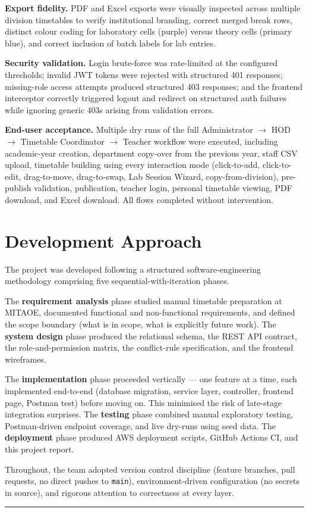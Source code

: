 \textbf{Export fidelity.} PDF and Excel exports were visually inspected across multiple division timetables to verify institutional branding, correct merged break rows, distinct colour coding for laboratory cells (purple) versus theory cells (primary blue), and correct inclusion of batch labels for lab entries.

\textbf{Security validation.} Login brute-force was rate-limited at the configured thresholds; invalid JWT tokens were rejected with structured 401 responses; missing-role access attempts produced structured 403 responses; and the frontend interceptor correctly triggered logout and redirect on structured auth failures while ignoring generic 403s arising from validation errors.

\textbf{End-user acceptance.} Multiple dry runs of the full Administrator $\rightarrow$ HOD $\rightarrow$ Timetable Coordinator $\rightarrow$ Teacher workflow were executed, including academic-year creation, department copy-over from the previous year, staff CSV upload, timetable building using every interaction mode (click-to-add, click-to-edit, drag-to-move, drag-to-swap, Lab Session Wizard, copy-from-division), pre-publish validation, publication, teacher login, personal timetable viewing, PDF download, and Excel download. All flows completed without intervention.

\section{Development Approach}

The project was developed following a structured software-engineering methodology comprising five sequential-with-iteration phases.

The \textbf{requirement analysis} phase studied manual timetable preparation at MITAOE, documented functional and non-functional requirements, and defined the scope boundary (what is in scope, what is explicitly future work). The \textbf{system design} phase produced the relational schema, the REST API contract, the role-and-permission matrix, the conflict-rule specification, and the frontend wireframes.

The \textbf{implementation} phase proceeded vertically --- one feature at a time, each implemented end-to-end (database migration, service layer, controller, frontend page, Postman test) before moving on. This minimised the risk of late-stage integration surprises. The \textbf{testing} phase combined manual exploratory testing, Postman-driven endpoint coverage, and live dry-runs using seed data. The \textbf{deployment} phase produced AWS deployment scripts, GitHub Actions CI, and this project report.

Throughout, the team adopted version control discipline (feature branches, pull requests, no direct pushes to \texttt{main}), environment-driven configuration (no secrets in source), and rigorous attention to correctness at every layer.

\vspace{10mm}
\hrule
